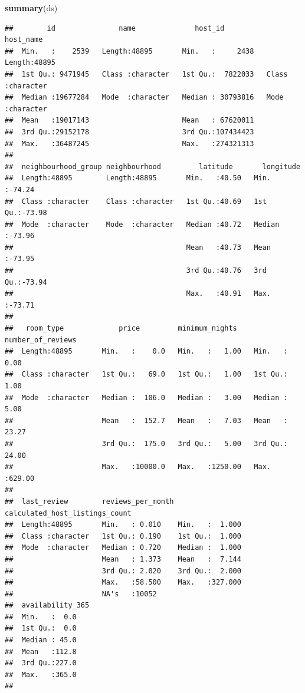 \documentclass[
]{article}
\newenvironment{Shaded}{\begin{snugshade}}{\end{snugshade}}
\newcommand{\KeywordTok}[1]{\textcolor[rgb]{0.13,0.29,0.53}{\textbf{#1}}}
\newcommand{\NormalTok}[1]{#1}
\begin{document}
\begin{Shaded}
\begin{Highlighting}[]
\KeywordTok{summary}\NormalTok{(ds)}
\end{Highlighting}
\end{Shaded}

\begin{verbatim}
##        id               name              host_id           host_name        
##  Min.   :    2539   Length:48895       Min.   :     2438   Length:48895      
##  1st Qu.: 9471945   Class :character   1st Qu.:  7822033   Class :character  
##  Median :19677284   Mode  :character   Median : 30793816   Mode  :character  
##  Mean   :19017143                      Mean   : 67620011                     
##  3rd Qu.:29152178                      3rd Qu.:107434423                     
##  Max.   :36487245                      Max.   :274321313                     
##                                                                              
##  neighbourhood_group neighbourhood         latitude       longitude     
##  Length:48895        Length:48895       Min.   :40.50   Min.   :-74.24  
##  Class :character    Class :character   1st Qu.:40.69   1st Qu.:-73.98  
##  Mode  :character    Mode  :character   Median :40.72   Median :-73.96  
##                                         Mean   :40.73   Mean   :-73.95  
##                                         3rd Qu.:40.76   3rd Qu.:-73.94  
##                                         Max.   :40.91   Max.   :-73.71  
##                                                                         
##   room_type             price         minimum_nights    number_of_reviews
##  Length:48895       Min.   :    0.0   Min.   :   1.00   Min.   :  0.00   
##  Class :character   1st Qu.:   69.0   1st Qu.:   1.00   1st Qu.:  1.00   
##  Mode  :character   Median :  106.0   Median :   3.00   Median :  5.00   
##                     Mean   :  152.7   Mean   :   7.03   Mean   : 23.27   
##                     3rd Qu.:  175.0   3rd Qu.:   5.00   3rd Qu.: 24.00   
##                     Max.   :10000.0   Max.   :1250.00   Max.   :629.00   
##                                                                          
##  last_review        reviews_per_month calculated_host_listings_count
##  Length:48895       Min.   : 0.010    Min.   :  1.000               
##  Class :character   1st Qu.: 0.190    1st Qu.:  1.000               
##  Mode  :character   Median : 0.720    Median :  1.000               
##                     Mean   : 1.373    Mean   :  7.144               
##                     3rd Qu.: 2.020    3rd Qu.:  2.000               
##                     Max.   :58.500    Max.   :327.000               
##                     NA's   :10052                                   
##  availability_365
##  Min.   :  0.0   
##  1st Qu.:  0.0   
##  Median : 45.0   
##  Mean   :112.8   
##  3rd Qu.:227.0   
##  Max.   :365.0   
## 
\end{verbatim}
\end{document}
